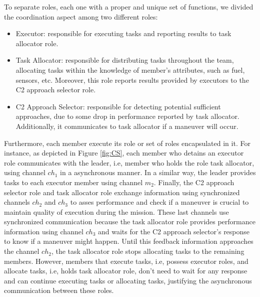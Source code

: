 To separate roles, each one with a proper and unique set of functions, we divided the coordination aspect among two different roles:

\begin{itemize}
    \item Executor: responsible for executing tasks and reporting results to task allocator role.
    \item Task Allocator: responsible for distributing tasks throughout the team, allocating tasks within the knowledge of member's attributes, such as fuel, sensors, etc. Moreover, this role reports results provided by executors to the C2 approach selector role.
    \item C2 Approach Selector: responsible for detecting potential sufficient approaches, due to some drop in performance reported by task allocator. Additionally, it communicates to task allocator if a maneuver will occur.  
\end{itemize}

Furthermore, each member execute its role or set of roles encapsulated in it. For instance, as depicted in Figure \ref{fig:CS}, each member who detains an executor role communicates with the leader, i.e, member who holds the role task allocator, using channel \textit{$ch_1$} in a asynchronous manner. In a similar way, the leader provides tasks to each executor member using channel \textit{$m_2$}. Finally, the C2 approach selector role and task allocator role exchange information using synchronized channels \textit{$ch_2$} and \textit{$ch_3$} to asses performance and check if a maneuver is crucial to maintain quality of execution during the mission. These last channels use synchronized communication because the task allocator role provides performance information using channel \textit{$ch_3$} and waits for the C2 approach selector's response to know if a maneuver might happen. Until this feedback information approaches the channel \textit{$ch_2$}, the task allocator role stops allocating tasks to the remaining members. However, members that execute tasks, i.e, possess executor roles, and allocate tasks, i.e, holds task allocator role, don't need to wait for any response and can continue executing tasks or allocating tasks, justifying the asynchronous communication between these roles.
